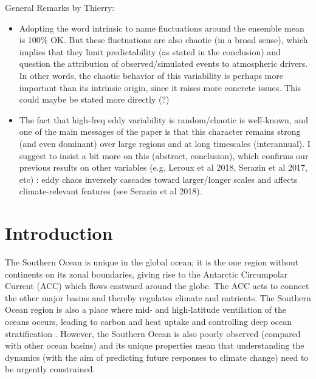 \documentclass{agujournal2019}
\begin{document}
{\color{red}General Remarks by Thierry:

\begin{itemize}
	\item
	Adopting the word intrinsic to name fluctuations around the ensemble mean is 100\% OK. But these fluctuations are also chaotic (in a broad sense), which implies that they limit predictability (as stated in the conclusion) and question the attribution of observed/simulated events to atmospheric drivers. In other words, the chaotic behavior of this variability is perhaps more important than its intrinsic origin, since it raises more concrete issues. This could maybe be stated more directly (?)

	\item 
	The fact that high-freq eddy variability is random/chaotic is well-known, and one of the main messages of the paper is that this character remains strong (and even dominant) over large regions and at long timescales (interannual). I suggest to insist a bit more on this (abstract, conclusion), which confirms our previous results on other variables (e.g. Leroux et al 2018, Serazin et al 2017, etc) : eddy chaos inversely cascades toward larger/longer scales and affects climate-relevant features (see Serazin et al 2018).

\end{itemize}
}


%
%

\section{Introduction}

The Southern Ocean is unique in the global ocean; it is the one region without continents on its zonal boundaries, giving rise to the Antarctic Circumpolar Current (ACC) which flows eastward around the globe.
The ACC acts to connect the other major basins and thereby regulates climate and nutrients.
The Southern Ocean region is also a place where mid- and high-latitude ventilation of the oceans occurs, leading to carbon and heat uptake and controlling deep ocean stratification \citep{Rousselet2021, Morrison2021}.
However, the Southern Ocean is also poorly observed (compared with other ocean basins) and its unique properties mean that understanding the dynamics (with the aim of predicting future responses to climate change) need to be urgently constrained.
\end{document}
